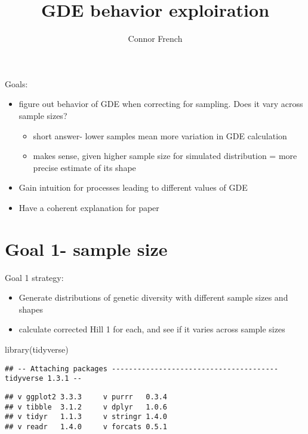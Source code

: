 \documentclass[
]{article}
\title{GDE behavior exploiration}
\author{Connor French}
\date{}
\newenvironment{Shaded}{\begin{snugshade}}{\end{snugshade}}
\newcommand{\FunctionTok}[1]{\textcolor[rgb]{0.00,0.00,0.00}{#1}}
\newcommand{\NormalTok}[1]{#1}
\providecommand{\tightlist}{%
  \setlength{\itemsep}{0pt}\setlength{\parskip}{0pt}}
\begin{document}
\maketitle

Goals:

\begin{itemize}
\tightlist
\item
  figure out behavior of GDE when correcting for sampling. Does it vary
  across sample sizes?

  \begin{itemize}
  \tightlist
  \item
    short answer- lower samples mean more variation in GDE calculation
  \item
    makes sense, given higher sample size for simulated distribution =
    more precise estimate of its shape
  \end{itemize}
\item
  Gain intuition for processes leading to different values of GDE\\
\item
  Have a coherent explanation for paper
\end{itemize}

\hypertarget{goal-1--sample-size}{%
\section{Goal 1- sample size}\label{goal-1--sample-size}}

Goal 1 strategy:

\begin{itemize}
\tightlist
\item
  Generate distributions of genetic diversity with different sample
  sizes and shapes
\item
  calculate corrected Hill 1 for each, and see if it varies across
  sample sizes
\end{itemize}

\begin{Shaded}
\begin{Highlighting}[]
\FunctionTok{library}\NormalTok{(tidyverse)}
\end{Highlighting}
\end{Shaded}

\begin{verbatim}
## -- Attaching packages --------------------------------------- tidyverse 1.3.1 --
\end{verbatim}

\begin{verbatim}
## v ggplot2 3.3.3     v purrr   0.3.4
## v tibble  3.1.2     v dplyr   1.0.6
## v tidyr   1.1.3     v stringr 1.4.0
## v readr   1.4.0     v forcats 0.5.1
\end{verbatim}
\end{document}
